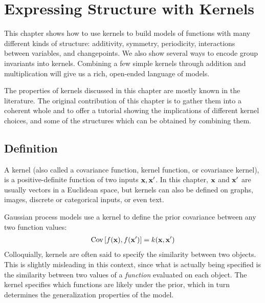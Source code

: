
\inbpdocument

\chapter{Expressing Structure with Kernels}
\label{ch:kernels}

This chapter shows how to use kernels to build models of functions with many different kinds of structure: additivity, symmetry, periodicity, interactions between variables, and changepoints.
We also show several ways to encode group invariants into kernels.
Combining a few simple kernels through addition and multiplication will give us a rich, open-ended language of models.

The properties of kernels discussed in this chapter are mostly known in the literature.
The original contribution of this chapter is to gather them into a coherent whole and to offer a tutorial showing the implications of different kernel choices, and some of the structures which can be obtained by combining them.


\section{Definition}

A kernel (also called a covariance function, kernel function, or covariance kernel), is a positive-definite function of two inputs ${\bf{x}}, {\bf{x}}'$. %
In this chapter, ${\bf{x}}$ and ${\bf{x}}'$ are usually vectors in a Euclidean space, but kernels can also be defined on graphs, images, discrete or categorical inputs, or even text.

Gaussian process models use a kernel to define the prior covariance between any two function values:
%
\begin{align}
\textrm{Cov} \left[f({\bf{x}}), f({\bf{x}}') \right] = k({\bf{x}},{\bf{x}}')
\end{align}
%
Colloquially, kernels are often said to specify the similarity between two objects.
This is slightly misleading in this context, since what is actually being specified is the similarity between two values of a \emph{function} evaluated on each object.
The kernel specifies which functions are likely under the \gp{} prior, which in turn determines the generalization properties of the model.





